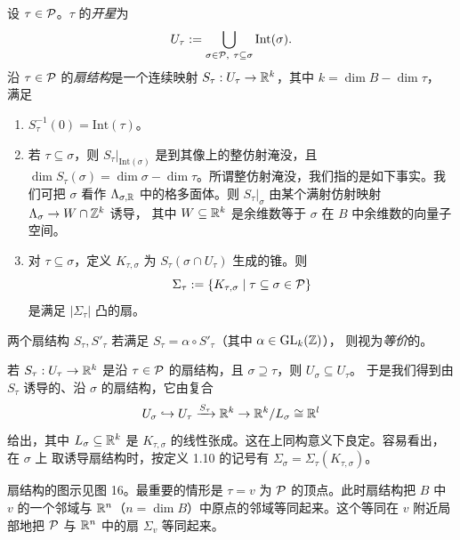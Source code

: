 \begin{definition}
设 $\tau\in\mathcal{P}$。$\tau$ 的\emph{开星}为
\[
U_\tau := \bigcup_{\sigma\in\mathcal{P},\ \tau\subseteq\sigma} \mathrm{Int}(\sigma).
\]
沿 $\tau\in\mathcal{P}$ 的\emph{扇结构}是一个连续映射 $S_\tau : U_\tau \to \mathbb{R}^k$，其中 $k = \dim B - \dim\tau$，
满足
\begin{enumerate}[label=(\arabic*),leftmargin=*]
\item $S_\tau^{-1}(0) = \mathrm{Int}(\tau)$。
\item 若 $\tau\subseteq\sigma$，则 $S_\tau|_{\mathrm{Int}(\sigma)}$ 是到其像上的整仿射淹没，且
$\dim S_\tau(\sigma) = \dim\sigma - \dim\tau$。所谓整仿射淹没，我们指的是如下事实。我们可把 $\sigma$ 看作
$\Lambda_{\sigma,\mathbb{R}}$ 中的格多面体。则 $S_\tau|_\sigma$ 由某个满射仿射映射 $\Lambda_\sigma \to W\cap\mathbb{Z}^k$ 诱导，
其中 $W \subseteq \mathbb{R}^k$ 是余维数等于 $\sigma$ 在 $B$ 中余维数的向量子空间。
\item 对 $\tau\subseteq\sigma$，定义 $K_{\tau,\sigma}$ 为 $S_\tau(\sigma\cap U_\tau)$ 生成的锥。则
\[
\Sigma_\tau := \{K_{\tau,\sigma} \mid \tau\subseteq\sigma\in\mathcal{P}\}
\]
是满足 $|\Sigma_\tau|$ 凸的扇。
\end{enumerate}
两个扇结构 $S_\tau, S'_\tau$ 若满足 $S_\tau = \alpha\circ S'_\tau$（其中 $\alpha \in \mathrm{GL}_k(\mathbb{Z})$），
则视为\emph{等价}的。
\end{definition}


若 $S_\tau : U_\tau \to \mathbb{R}^k$ 是沿 $\tau\in\mathcal{P}$ 的扇结构，且 $\sigma\supseteq\tau$，则 $U_\sigma\subseteq U_\tau$。
于是我们得到由 $S_\tau$ 诱导的、沿 $\sigma$ 的扇结构，它由复合
\[
U_\sigma \hookrightarrow U_\tau \xrightarrow{S_\tau} \mathbb{R}^k \to \mathbb{R}^k/L_\sigma \cong \mathbb{R}^l
\]
给出，其中 $L_\sigma \subseteq \mathbb{R}^k$ 是 $K_{\tau,\sigma}$ 的线性张成。这在上同构意义下良定。容易看出，在 $\sigma$ 上
取诱导扇结构时，按定义 1.10 的记号有 $\Sigma_\sigma = \Sigma_\tau(K_{\tau,\sigma})$。

扇结构的图示见图 16。最重要的情形是 $\tau = v$ 为 $\mathcal{P}$ 的顶点。此时扇结构把 $B$ 中 $v$ 的一个邻域与
$\mathbb{R}^n$（$n = \dim B$）中原点的邻域等同起来。这个等同在 $v$ 附近局部地把 $\mathcal{P}$ 与 $\mathbb{R}^n$ 中的扇 $\Sigma_v$
等同起来。

